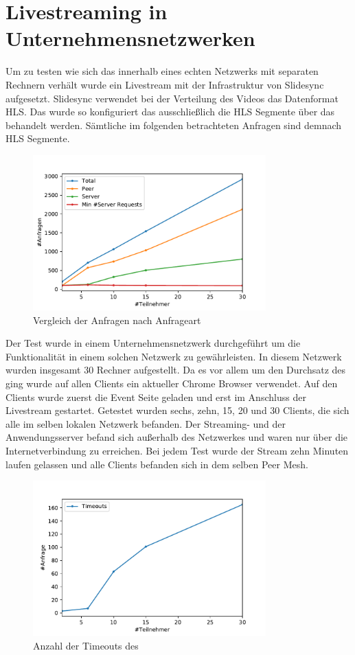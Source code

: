 \section{Livestreaming in Unternehmensnetzwerken}
Um zu testen wie sich das \cdn innerhalb eines echten Netzwerks mit separaten Rechnern verhält wurde ein Livestream mit der Infrastruktur von Slidesync aufgesetzt. Slidesync verwendet bei der Verteilung des Videos das Datenformat HLS. Das \cdn wurde so konfiguriert das ausschließlich die HLS Segmente über das \cdn behandelt werden. Sämtliche im folgenden betrachteten Anfragen sind demnach HLS Segmente. 
\begin{figure}[!h]
	\centering
	\includegraphics[width=0.8\textwidth]{figures/clients_line_chart}
	\caption[A Figure Short-Title]{Vergleich der Anfragen nach Anfrageart}
	\label{fig:live_stream_line_chart}
\end{figure}
Der Test wurde in einem Unternehmensnetzwerk durchgeführt um die Funktionalität in einem solchen Netzwerk zu gewährleisten. In diesem Netzwerk wurden insgesamt 30 Rechner aufgestellt. Da es vor allem um den Durchsatz des \cdns ging wurde auf allen Clients ein aktueller Chrome Browser verwendet. Auf den Clients wurde zuerst die Event Seite geladen und erst im Anschluss der Livestream gestartet. Getestet wurden sechs, zehn, 15, 20 und 30 Clients, die sich alle im selben lokalen Netzwerk befanden. Der Streaming- und der Anwendungsserver befand sich außerhalb des Netzwerkes und waren nur über die Internetverbindung zu erreichen. Bei jedem Test wurde der Stream zehn Minuten laufen gelassen und alle Clients befanden sich in dem selben Peer Mesh.

\begin{figure}[!h]
	\centering
	\includegraphics[width=0.8\textwidth]{figures/timeouts}
	\caption[A Figure Short-Title]{Anzahl der Timeouts des \cdns}
	\label{fig:timeouts}
\end{figure}


